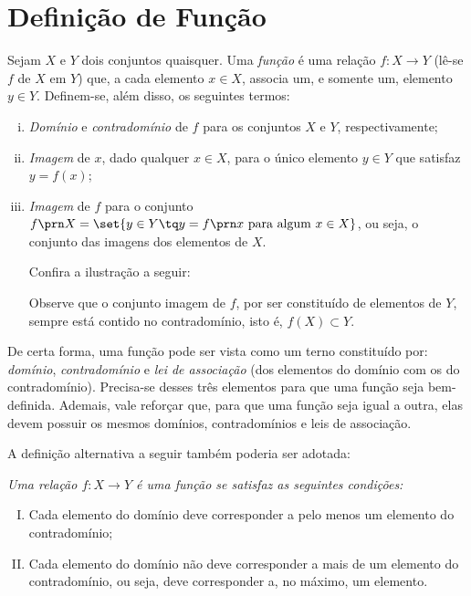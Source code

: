\section{Definição de Função}

\begin{definition}
Sejam $X$ e $Y$ dois conjuntos quaisquer.
Uma \emph{função} é uma relação $f: X \to Y$ (lê-se $f$ de $X$ em $Y$) que, a cada elemento $x \in X$, associa um, e somente um, elemento $y \in Y$.
Definem-se, além disso, os seguintes termos:
%
\begin{enumerate}[(i)]
\item \emph{Domínio} e \emph{contradomínio} de $f$ para os conjuntos $X$ e $Y$, respectivamente;
\item \emph{Imagem} de $x$, dado qualquer $x \in X$, para o único elemento $y \in Y$ que satisfaz $y = f(x)$;
\item \emph{Imagem} de $f$ para o conjunto $f\prn X = \set{y \in Y \tq y = f \prn x \text{ para algum } x \in X }$, ou seja, o conjunto das imagens dos elementos de $X$.

Confira a ilustração a seguir:
\begin{center}
\end{center}
Observe que o conjunto imagem de $f$, por ser constituído de elementos de $Y$, sempre está contido no contradomínio, isto é, $f(X) \subset Y$.
\end{enumerate}
\end{definition}

De certa forma, uma função pode ser vista como um terno constituído por: \emph{domínio}, \emph{contradomínio} e \emph{lei de associação} (dos elementos do domínio com os do contradomínio). 
Precisa-se desses três elementos para que uma função seja bem-definida. Ademais, vale reforçar que, para que uma função seja igual a outra, elas devem possuir os mesmos domínios, contradomínios e leis de associação.

A definição alternativa a seguir também poderia ser adotada:
{\it \label{def:funcao-alternativa} Uma relação $f: X \to Y$ é uma \emph {função} se satisfaz as seguintes condições:
%
\begin{enumerate}[(I)]
  \item Cada elemento do domínio deve corresponder a pelo menos um elemento do contradomínio;
  \item Cada elemento do domínio não deve corresponder a mais de um elemento do contradomínio, ou seja, deve corresponder a, no máximo, um elemento.
\end{enumerate}}


